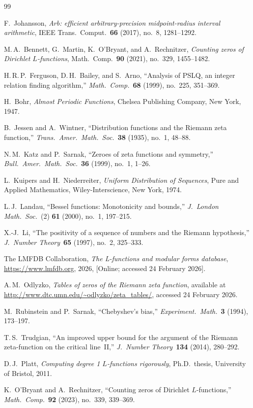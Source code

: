 \documentclass[12pt,reqno]{amsart}
\theoremstyle{plain}
\theoremstyle{definition}
\theoremstyle{remark}
\begin{document}
\begin{thebibliography}{99}

F.~Johansson,
\emph{Arb: efficient arbitrary-precision midpoint-radius interval arithmetic},
IEEE Trans.\ Comput.\ \textbf{66} (2017), no.~8, 1281--1292.

M.\,A.~Bennett, G.~Martin, K.~O'Bryant, and A.~Rechnitzer,
\emph{Counting zeros of Dirichlet $L$-functions},
Math.\ Comp.\ \textbf{90} (2021), no.~329, 1455--1482.

H.\,R.\,P.~Ferguson, D.\,H.~Bailey, and S.~Arno,
``Analysis of PSLQ, an integer relation finding algorithm,''
\emph{Math.\ Comp.}\ \textbf{68} (1999), no.~225, 351--369.


H.~Bohr,
\emph{Almost Periodic Functions},
Chelsea Publishing Company, New York, 1947.



B.~Jessen and A.~Wintner,
``Distribution functions and the Riemann zeta function,''
\emph{Trans.\ Amer.\ Math.\ Soc.}\ \textbf{38} (1935), no.~1, 48--88.

N.\,M.~Katz and P.~Sarnak,
``Zeroes of zeta functions and symmetry,''
\emph{Bull.\ Amer.\ Math.\ Soc.}\ \textbf{36} (1999), no.~1, 1--26.

L.~Kuipers and H.~Niederreiter,
\emph{Uniform Distribution of Sequences},
Pure and Applied Mathematics, Wiley-Interscience, New York, 1974.

L.\,J.~Landau,
``Bessel functions: Monotonicity and bounds,''
\emph{J.\ London Math.\ Soc.}\ (2) \textbf{61} (2000), no.~1, 197--215.

X.-J.~Li,
``The positivity of a sequence of numbers and the Riemann hypothesis,''
\emph{J.\ Number Theory}\ \textbf{65} (1997), no.~2, 325--333.

The {LMFDB Collaboration},
\emph{The {L}-functions and modular forms database},
\url{https://www.lmfdb.org}, 2026,
[Online; accessed 24 February 2026].


A.\,M.~Odlyzko,
\emph{Tables of zeros of the Riemann zeta function},
available at \url{http://www.dtc.umn.edu/~odlyzko/zeta_tables/},
accessed 24 February 2026.

M.~Rubinstein and P.~Sarnak,
``Chebyshev's bias,''
\emph{Experiment.\ Math.}\ \textbf{3} (1994), 173--197.

T.\,S.~Trudgian,
``An improved upper bound for the argument of the Riemann zeta-function on the critical line~II,''
\emph{J.\ Number Theory}\ \textbf{134} (2014), 280--292.

D.\,J.~Platt,
\emph{Computing degree 1 $L$-functions rigorously},
Ph.D.\ thesis, University of Bristol, 2011.

K.~O'Bryant and A.~Rechnitzer,
``Counting zeros of Dirichlet $L$-functions,''
\emph{Math.\ Comp.}\ \textbf{92} (2023), no.~339, 339--369.


\end{thebibliography}
\end{document}
